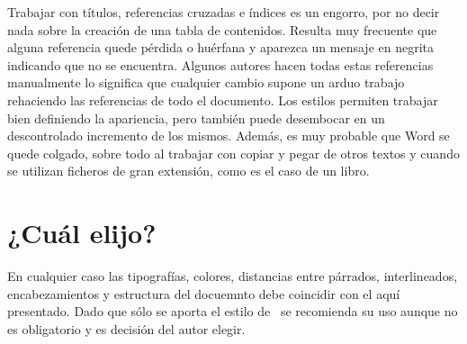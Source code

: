 Trabajar con títulos, referencias cruzadas e índices es un engorro, por no decir nada sobre
la creación de una tabla de contenidos. Resulta muy frecuente que alguna referencia quede
pérdida o huérfana y aparezca un mensaje en negrita indicando que no se encuentra. Algunos autores hacen todas estas referencias manualmente lo significa que cualquier cambio supone un arduo trabajo rehaciendo las referencias de todo el documento.
Los estilos permiten trabajar bien definiendo la apariencia, pero también puede desembocar
en un descontrolado incremento de los mismos. Además, es muy probable que
Word\textsuperscript{\textregistered} se quede colgado, sobre todo al trabajar con copiar y pegar de otros textos y cuando
se utilizan ficheros de gran extensión, como es el caso de un libro.

\section{¿Cuál elijo?}

En cualquier caso las tipografías, colores, distancias entre párrados, interlineados, encabezamientos y estructura del docuemnto debe coincidir con el aquí presentado. Dado que sólo se aporta el estilo de \LaTeXe\ se recomienda su uso aunque no es obligatorio y es decisión del autor elegir.
